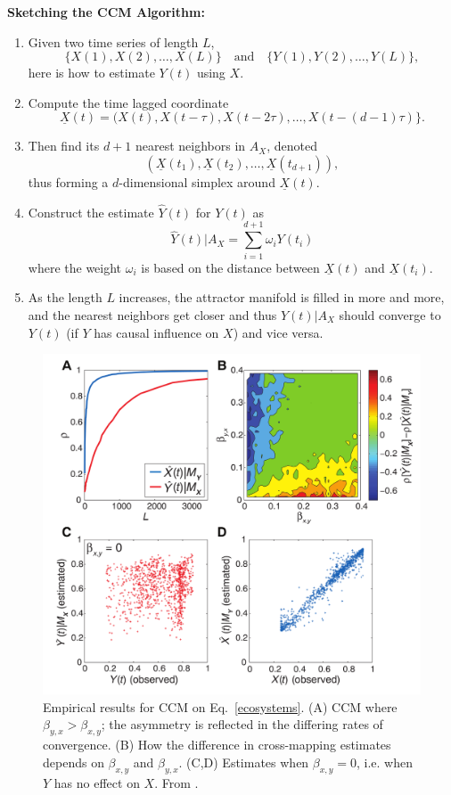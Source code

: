 \documentclass[12pt]{article}
\theoremstyle{definition}
\theoremstyle{remark}
\newcommand{\speccite}[1]{\citetitle{#1} \parencite{#1}}
\begin{document}
\textbf{Sketching the CCM Algorithm:}
\begin{enumerate}
    \item Given two time series of length $L$,
        \[ \{ X(1), X(2), \ldots, X(L) \} \quad \text{and} \quad \{ Y(1), Y(2), \ldots, Y(L) \}, \]
        here is how to estimate $Y(t)$ using $X$.
    \item Compute the time lagged coordinate
        \[ \underline{X}(t) = ( X(t), X(t - \tau), X(t - 2 \tau), \ldots, X(t-(d-1)\tau)\}. \]
    \item Then find its $d+1$ nearest neighbors in $A_{X}$, denoted
        \[ (\underline{X}(t_1), \underline{X}(t_2), \ldots, \underline{X}(t_{d+1}) ), \]
        thus forming a $d$-dimensional simplex around $\underline{X}(t)$.
    \item Construct the estimate $\hat Y(t)$ for $Y(t)$ as
        \[ \hat Y(t) | A_X = \sum_{i=1}^{d+1} \omega_{i} Y(t_i) \]
        where the weight $\omega_{i}$ is based on the distance between $\underline X(t)$ and $\underline X(t_i)$.
    \item As the length $L$ increases, the attractor manifold is filled in more and more, and the nearest neighbors get closer and thus $\hat Y(t) | A_X$ should converge to $Y(t)$ (if $Y$ has causal influence on $X$) and vice versa.
\end{enumerate}

\begin{figure}[H]
    \centering
    \includegraphics[scale=0.55]{figures/convergence.png}
    \caption{Empirical results for CCM on Eq.~\ref{ecosystems}. (A) CCM where $\beta_{y,x} > \beta_{x,y}$; the asymmetry is reflected in the differing rates of convergence. (B) How the difference in cross-mapping estimates depends on $\beta_{x,y}$ and $\beta_{y,x}$.   (C,D) Estimates when $\beta_{x,y} = 0$, i.e. when $Y$ has no effect on $X$. From \speccite{sugihara2012detecting}.}
\end{figure}
\end{document}
